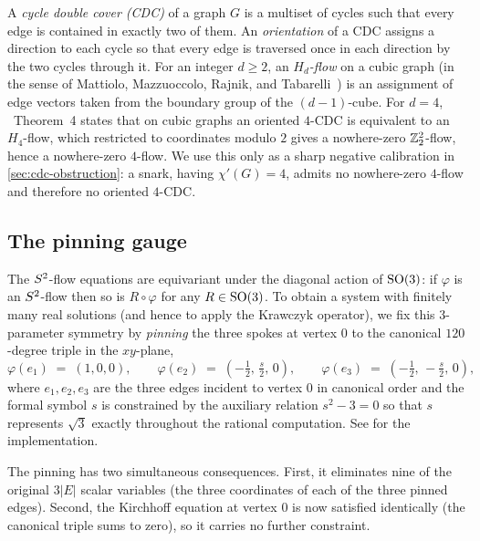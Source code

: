 A \emph{cycle double cover (CDC)} of a graph $G$ is a multiset of
cycles such that every edge is contained in exactly two of them.
An \emph{orientation} of a CDC assigns a direction to each cycle so
that every edge is traversed once in each direction by the two cycles
through it. For an integer $d \ge 2$, an \emph{$H_d$-flow} on a cubic
graph (in the sense of Mattiolo, Mazzuoccolo, Rajnik, and
Tabarelli~\cite{MMRT25}) is an assignment of edge vectors taken from
the boundary group of the $(d-1)$-cube. For $d = 4$,
\cite{MMRT25}~Theorem~4 states that on cubic graphs an oriented
$4$-CDC is equivalent to an $H_4$-flow, which restricted to coordinates
modulo $2$ gives a nowhere-zero $\mathbb{Z}_2^{2}$-flow, hence a nowhere-zero
$4$-flow. We use this only as a sharp negative calibration in
\cref{sec:cdc-obstruction}: a snark, having $\chi'(G) = 4$, admits no
nowhere-zero $4$-flow and therefore no oriented $4$-CDC.


\subsection{The pinning gauge}
\label{sec:prelim-gauge}

The $S^{2}$-flow equations are equivariant under the diagonal
action of $\mathrm{SO}(3)$: if $\varphi$ is an $S^{2}$-flow then so is
$R \circ \varphi$ for any $R \in \mathrm{SO}(3)$. To obtain a system with
finitely many real solutions (and hence to apply the Krawczyk
operator), we fix this $3$-parameter symmetry by \emph{pinning} the
three spokes at vertex $0$ to the canonical $120$-degree triple in the
$xy$-plane,
\[
   \varphi(e_1) \;=\; (1, 0, 0), \qquad
   \varphi(e_2) \;=\; (-\tfrac{1}{2},\, \tfrac{s}{2},\, 0), \qquad
   \varphi(e_3) \;=\; (-\tfrac{1}{2},\, -\tfrac{s}{2},\, 0),
\]
where $e_1, e_2, e_3$ are the three edges incident to vertex $0$ in
canonical order and the formal symbol $s$ is constrained by the
auxiliary relation $s^{2} - 3 = 0$ so that $s$ represents $\sqrt{3}$
exactly throughout the rational computation. See
 for the implementation.

The pinning has two simultaneous consequences. First, it eliminates
nine of the original $3|E|$ scalar variables (the three
coordinates of each of the three pinned edges). Second, the Kirchhoff
equation at vertex $0$ is now satisfied identically (the canonical
triple sums to zero), so it carries no further constraint.

